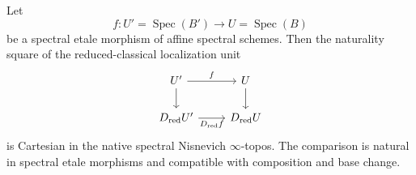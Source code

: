 \begin{lemma}
\label{lem:bnla-dred-etale-cartesian}
Let
\[
    f:U'=\operatorname{Spec}(B')
    \longrightarrow
    U=\operatorname{Spec}(B)
\]
be a spectral etale morphism of affine spectral schemes.  Then the naturality
square of the reduced-classical localization unit
\[
\begin{tikzcd}
U' \arrow[r,"f"] \arrow[d] & U \arrow[d]\\
D_{\mathrm{red}}U' \arrow[r,"D_{\mathrm{red}}f"'] &
D_{\mathrm{red}}U
\end{tikzcd}
\]
is Cartesian in the native spectral Nisnevich $\infty$-topos.  The
comparison is natural in spectral etale morphisms and compatible with
composition and base change.
\end{lemma}

